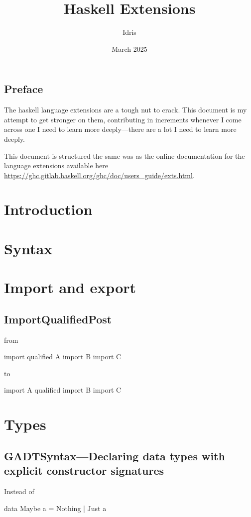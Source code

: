 \documentclass[openany, 12pt]{book}
\title{Haskell Extensions}
\author{Idris}
\date{March 2025}
\begin{document}
\tableofcontents

\frontmatter
\chapter{Preface}
The haskell language extensions are a tough nut to crack. This document is my
attempt to get stronger on them, contributing in increments whenever I come
across one I need to learn more deeply---there are a lot I need to learn more
deeply.

This document is structured the same was as the online documentation for the
language extensions available here \url{https://ghc.gitlab.haskell.org/ghc/doc/users_guide/exts.html}.

\mainmatter
\part{Introduction}
\part{Syntax}
\part{Import and export}

\chapter{ImportQualifiedPost}
from
\begin{haskell}{}
import qualified A
import           B
import           C
\end{haskell}

to
\begin{haskell}{}
import A qualified
import B
import C
\end{haskell}


\part{Types}


\setcounter{chapter}{7}
\chapter{GADTSyntax---Declaring data types with explicit constructor signatures}
Instead of
\begin{haskell}{}
data Maybe a = Nothing | Just a
\end{haskell}
\end{document}
